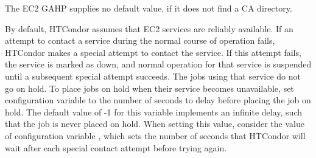 The EC2 GAHP supplies no default value, if it does not find a CA directory.

By default, HTCondor assumes that EC2 services are reliably available.
If an attempt to contact a service during the normal course of operation fails,
HTCondor makes a special attempt to contact the service.
If this attempt fails, 
the service is marked as down,
and normal operation for that service is
suspended until a subsequent special attempt succeeds.  
The jobs using that service do not go on hold.
To place jobs on hold when their service becomes unavailable,
set configuration variable  to 
the number of seconds to delay before placing the job on hold.
The default value of -1 for this variable implements 
an infinite delay, such that the job is never placed on hold.
When setting this value, 
consider the value of configuration variable
,
which sets the number of seconds that HTCondor will wait after each
special contact attempt before trying again.
